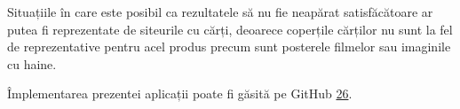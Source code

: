 Situațiile în care este posibil ca rezultatele să nu fie neapărat satisfăcătoare ar putea fi reprezentate de siteurile cu cărți, deoarece coperțile cărților nu sunt la fel de reprezentative pentru acel produs precum sunt posterele filmelor sau imaginile cu haine.

Împlementarea prezentei aplicații poate fi găsită pe GitHub \hyperlink{kingrec}{26}.